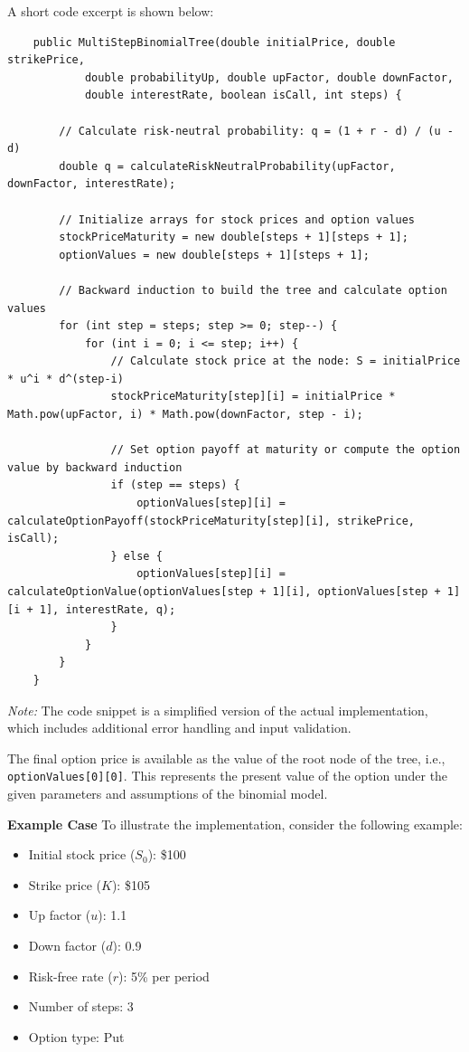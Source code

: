 \documentclass{article}
\begin{document}
    A short code excerpt is shown below:

    \small
    \begin{verbatim}
    public MultiStepBinomialTree(double initialPrice, double strikePrice,
            double probabilityUp, double upFactor, double downFactor,
            double interestRate, boolean isCall, int steps) {

        // Calculate risk-neutral probability: q = (1 + r - d) / (u - d)
        double q = calculateRiskNeutralProbability(upFactor, downFactor, interestRate);

        // Initialize arrays for stock prices and option values
        stockPriceMaturity = new double[steps + 1][steps + 1];
        optionValues = new double[steps + 1][steps + 1];

        // Backward induction to build the tree and calculate option values
        for (int step = steps; step >= 0; step--) {
            for (int i = 0; i <= step; i++) {
                // Calculate stock price at the node: S = initialPrice * u^i * d^(step-i)
                stockPriceMaturity[step][i] = initialPrice * Math.pow(upFactor, i) * Math.pow(downFactor, step - i);

                // Set option payoff at maturity or compute the option value by backward induction
                if (step == steps) {
                    optionValues[step][i] = calculateOptionPayoff(stockPriceMaturity[step][i], strikePrice, isCall);
                } else {
                    optionValues[step][i] = calculateOptionValue(optionValues[step + 1][i], optionValues[step + 1][i + 1], interestRate, q);
                }
            }
        }
    }
    \end{verbatim}

    \normalsize

    \emph{Note:} The code snippet is a simplified version of the actual implementation, which includes additional error handling and input validation.

    \medbreak

    The final option price is available as the value of the root node of the tree, i.e., \texttt{optionValues[0][0]}. This represents the present value of the option under the given parameters and assumptions of the binomial model.

    \medbreak

    \textbf{Example Case}
    To illustrate the implementation, consider the following example:

    \begin{itemize}
        \item Initial stock price (\( S_0 \)): \$100
        \item Strike price (\( K \)): \$105
        \item Up factor (\( u \)): 1.1
        \item Down factor (\( d \)): 0.9
        \item Risk-free rate (\( r \)): 5\% per period
        \item Number of steps: 3
        \item Option type: Put
    \end{itemize}
\end{document}
